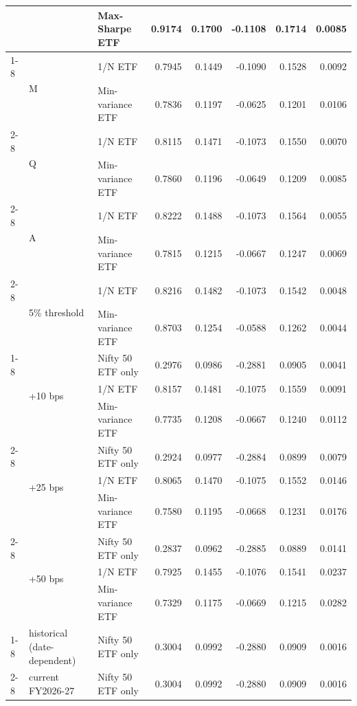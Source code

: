 \begin{table}
\begin{tabular}{lllrrrrr}
 &  & Max-Sharpe ETF & 0.9174 & 0.1700 & -0.1108 & 0.1714 & 0.0085 \\
\cline{1-8} \cline{2-8}
\multirow[t]{8}{*}{rebalancing} & \multirow[t]{2}{*}{M} & 1/N ETF & 0.7945 & 0.1449 & -0.1090 & 0.1528 & 0.0092 \\
 &  & Min-variance ETF & 0.7836 & 0.1197 & -0.0625 & 0.1201 & 0.0106 \\
\cline{2-8}
 & \multirow[t]{2}{*}{Q} & 1/N ETF & 0.8115 & 0.1471 & -0.1073 & 0.1550 & 0.0070 \\
 &  & Min-variance ETF & 0.7860 & 0.1196 & -0.0649 & 0.1209 & 0.0085 \\
\cline{2-8}
 & \multirow[t]{2}{*}{A} & 1/N ETF & 0.8222 & 0.1488 & -0.1073 & 0.1564 & 0.0055 \\
 &  & Min-variance ETF & 0.7815 & 0.1215 & -0.0667 & 0.1247 & 0.0069 \\
\cline{2-8}
 & \multirow[t]{2}{*}{5\% threshold} & 1/N ETF & 0.8216 & 0.1482 & -0.1073 & 0.1542 & 0.0048 \\
 &  & Min-variance ETF & 0.8703 & 0.1254 & -0.0588 & 0.1262 & 0.0044 \\
\cline{1-8} \cline{2-8}
\multirow[t]{9}{*}{extra cost} & \multirow[t]{3}{*}{+10 bps} & Nifty 50 ETF only & 0.2976 & 0.0986 & -0.2881 & 0.0905 & 0.0041 \\
 &  & 1/N ETF & 0.8157 & 0.1481 & -0.1075 & 0.1559 & 0.0091 \\
 &  & Min-variance ETF & 0.7735 & 0.1208 & -0.0667 & 0.1240 & 0.0112 \\
\cline{2-8}
 & \multirow[t]{3}{*}{+25 bps} & Nifty 50 ETF only & 0.2924 & 0.0977 & -0.2884 & 0.0899 & 0.0079 \\
 &  & 1/N ETF & 0.8065 & 0.1470 & -0.1075 & 0.1552 & 0.0146 \\
 &  & Min-variance ETF & 0.7580 & 0.1195 & -0.0668 & 0.1231 & 0.0176 \\
\cline{2-8}
 & \multirow[t]{3}{*}{+50 bps} & Nifty 50 ETF only & 0.2837 & 0.0962 & -0.2885 & 0.0889 & 0.0141 \\
 &  & 1/N ETF & 0.7925 & 0.1455 & -0.1076 & 0.1541 & 0.0237 \\
 &  & Min-variance ETF & 0.7329 & 0.1175 & -0.0669 & 0.1215 & 0.0282 \\
\cline{1-8} \cline{2-8}
\multirow[t]{6}{*}{tax regime} & historical (date-dependent) & Nifty 50 ETF only & 0.3004 & 0.0992 & -0.2880 & 0.0909 & 0.0016 \\
\cline{2-8}
 & current FY2026-27 & Nifty 50 ETF only & 0.3004 & 0.0992 & -0.2880 & 0.0909 & 0.0016 \\

\end{tabular}
\end{table}
